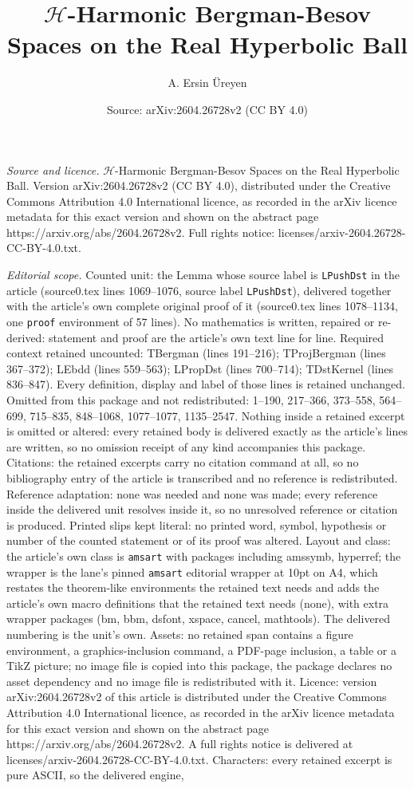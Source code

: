 \documentclass[10pt,a4paper]{amsart}
\title[$\mathcal H$-Harmonic Bergman-Besov Spaces on the Real Hyper]{$\mathcal H$-Harmonic Bergman-Besov Spaces on the Real Hyperbolic Ball}
\author{A. Ersin \"Ureyen}
\date{Source: arXiv:2604.26728v2 (CC BY 4.0)}
\begin{document}
\maketitle

\noindent\emph{Source and licence.} $\mathcal H$-Harmonic Bergman-Besov Spaces on the Real Hyperbolic Ball. Version arXiv:2604.26728v2 (CC BY 4.0), distributed under the Creative Commons Attribution 4.0 International licence, as recorded in the arXiv licence metadata for this exact version and shown on the abstract page https://arxiv.org/abs/2604.26728v2. Full rights notice: licenses/arxiv-2604.26728-CC-BY-4.0.txt.\par\smallskip

\noindent\textit{Editorial scope.} Counted unit: the Lemma whose source label is \texttt{LPushDst} in the article (source0.tex lines 1069--1076, source label \texttt{LPushDst}), delivered together with the article's own complete original proof of it (source0.tex lines 1078--1134, one \texttt{proof} environment of 57 lines). No mathematics is written, repaired or re-derived: statement and proof are the article's own text line for line. Required context retained uncounted: TBergman (lines 191--216); TProjBergman (lines 367--372); LEbdd (lines 559--563); LPropDst (lines 700--714); TDstKernel (lines 836--847). Every definition, display and label of those lines is retained unchanged. Omitted from this package and not redistributed: 1--190, 217--366, 373--558, 564--699, 715--835, 848--1068, 1077--1077, 1135--2547. Nothing inside a retained excerpt is omitted or altered: every retained body is delivered exactly as the article's lines are written, so no omission receipt of any kind accompanies this package. Citations: the retained excerpts carry no citation command at all, so no bibliography entry of the article is transcribed and no reference is redistributed. Reference adaptation: none was needed and none was made; every reference inside the delivered unit resolves inside it, so no unresolved reference or citation is produced. Printed slips kept literal: no printed word, symbol, hypothesis or number of the counted statement or of its proof was altered. Layout and class: the article's own class is \texttt{amsart} with packages including amssymb, hyperref; the wrapper is the lane's pinned \texttt{amsart} editorial wrapper at 10pt on A4, which restates the theorem-like environments the retained text needs and adds the article's own macro definitions that the retained text needs (none), with extra wrapper packages (bm, bbm, dsfont, xspace, cancel, mathtools). The delivered numbering is the unit's own. Assets: no retained span contains a figure environment, a graphics-inclusion command, a PDF-page inclusion, a table or a TikZ picture; no image file is copied into this package, the package declares no asset dependency and no image file is redistributed with it. Licence: version arXiv:2604.26728v2 of this article is distributed under the Creative Commons Attribution 4.0 International licence, as recorded in the arXiv licence metadata for this exact version and shown on the abstract page https://arxiv.org/abs/2604.26728v2. A full rights notice is delivered at licenses/arxiv-2604.26728-CC-BY-4.0.txt. Characters: every retained excerpt is pure ASCII, so the delivered engine, 
\end{document}
